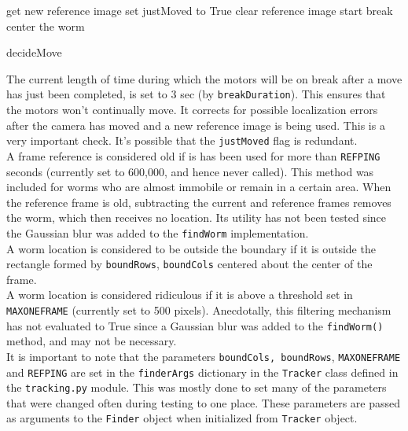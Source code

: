 \documentclass[main.tex]{subfiles}
\begin{document}
\begin{algorithm}[h]
    {
        {
            get new reference image\;
        }
        {
            {
                set justMoved to True\;
                clear reference image\;
                start break\;
                center the worm\;
            }
        }
    }
\caption{decideMove}
\end{algorithm}
The current length of time during which the motors will be on break after a move has just been completed, is set to 3 sec (by \verb|breakDuration|). This ensures that the motors won't continually move. It corrects for possible localization errors after the camera has moved and a new reference image is being used. This is a very important check. It's possible that the \verb|justMoved| flag is redundant. \\

A frame reference is considered old if is has been used for more than \verb|REFPING| seconds (currently set to 600,000, and hence never called). This method was included for worms who are almost immobile or remain in a certain area. When the reference frame is old, subtracting the current and reference frames removes the worm, which then receives no location. Its utility has not been tested since the Gaussian blur was added to the \verb|findWorm| implementation. \\

A worm location is considered to be outside the boundary if it is outside the rectangle formed by \verb|boundRows|, \verb|boundCols| centered about the center of the frame. \\

A worm location is considered ridiculous if it is above a threshold set in \verb|MAXONEFRAME| (currently set to 500 pixels). Anecdotally, this filtering mechanism has not evaluated to True since a Gaussian blur was added to the \verb|findWorm()| method, and may not be necessary.\\ 

It is important to note that the parameters \verb|boundCols, boundRows|, \verb|MAXONEFRAME| and \verb|REFPING| are set in the \verb|finderArgs| dictionary in the \verb|Tracker| class defined in the \verb|tracking.py| module. This was mostly done to set many of the parameters that were changed often during testing to one place. These parameters are passed as arguments to the \verb|Finder| object when initialized from \verb|Tracker| object. 
\end{document}
